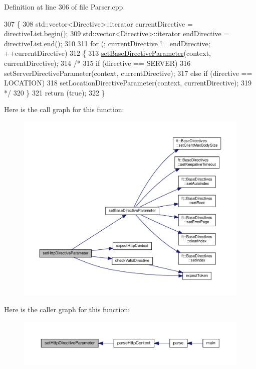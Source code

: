 Definition at line 306 of file Parser.\+cpp.


\begin{DoxyCode}
307     \{
308         std::vector<Directive>::iterator    currentDirective = directiveList.begin();
309         std::vector<Directive>::iterator    endDirective = directiveList.end();
310 
311         \textcolor{keywordflow}{for} (; currentDirective != endDirective; ++currentDirective)
312         \{
313             \hyperlink{classft_1_1_parser_a9f412d172694519d0d8dd9edacd257c0}{setBaseDirectiveParameter}(context, currentDirective);
314 \textcolor{comment}{/*}
315 \textcolor{comment}{            if (directive == SERVER)}
316 \textcolor{comment}{                setServerDirectiveParameter(context, currentDirective);}
317 \textcolor{comment}{            else if (directive == LOCATION)}
318 \textcolor{comment}{                setLocationDirectiveParameter(context, currentDirective);}
319 \textcolor{comment}{*/}
320         \}
321         \textcolor{keywordflow}{return} (\textcolor{keyword}{true});
322     \}
\end{DoxyCode}
Here is the call graph for this function\+:
\nopagebreak
\begin{figure}[H]
\begin{center}
\leavevmode
\includegraphics[width=350pt]{classft_1_1_parser_a5d287909e4c513e20b017ba0699b0cbf_cgraph}
\end{center}
\end{figure}
Here is the caller graph for this function\+:
\nopagebreak
\begin{figure}[H]
\begin{center}
\leavevmode
\includegraphics[width=350pt]{classft_1_1_parser_a5d287909e4c513e20b017ba0699b0cbf_icgraph}
\end{center}
\end{figure}
